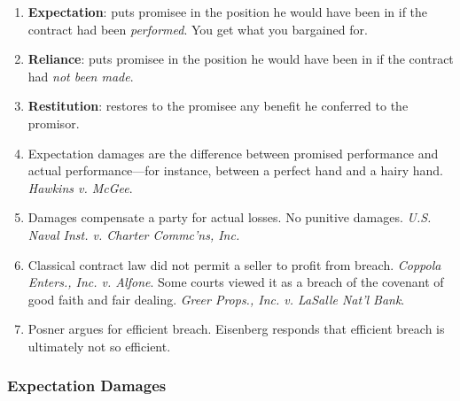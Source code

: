 \begin{enumerate}
    \item \textbf{Expectation}: puts promisee in the position he would have 
    been in if the contract had been \emph{performed}. You get what you 
    bargained for.
    \item \textbf{Reliance}: puts promisee in the position he would have been 
    in 
    if the contract had \emph{not been made}.
    \item \textbf{Restitution}: restores to the promisee any benefit he 
    conferred to the promisor.
    \item Expectation damages are the difference between promised performance 
    and actual performance---for instance, between a perfect hand and a hairy 
    hand. \emph{Hawkins v. McGee}.
    \item Damages compensate a party for actual losses. No punitive damages. 
    \emph{U.S. Naval Inst. v.  Charter Commc'ns, Inc.}
    \item Classical contract law did not permit a seller to profit from 
    breach. \emph{Coppola Enters., Inc. v. Alfone}. Some courts viewed it as a 
    breach of the covenant of good faith and fair dealing. \emph{Greer Props., 
    Inc. v. LaSalle Nat'l Bank}.
    \item Posner argues for efficient breach. Eisenberg responds that 
    efficient breach is ultimately not so efficient.
\end{enumerate}

\subsubsection{Expectation Damages}

